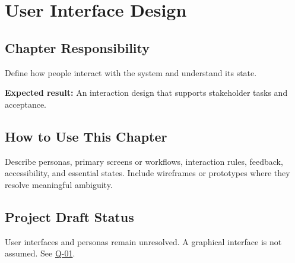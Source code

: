 \chapter{User Interface Design}
\section{Chapter Responsibility}
\label{Section:UserInterfaceDesignResponsibility}
Define how people interact with the system and understand its state.

\noindent\textbf{Expected result:} An interaction design that supports stakeholder tasks and acceptance.

\section{How to Use This Chapter}
Describe personas, primary screens or workflows, interaction rules, feedback, accessibility, and essential states. Include wireframes or prototypes where they resolve meaningful ambiguity.
\section{Project Draft Status}
User interfaces and personas remain unresolved. A graphical interface is not assumed. See \hyperref[Question:Q-01]{Q-01}.
